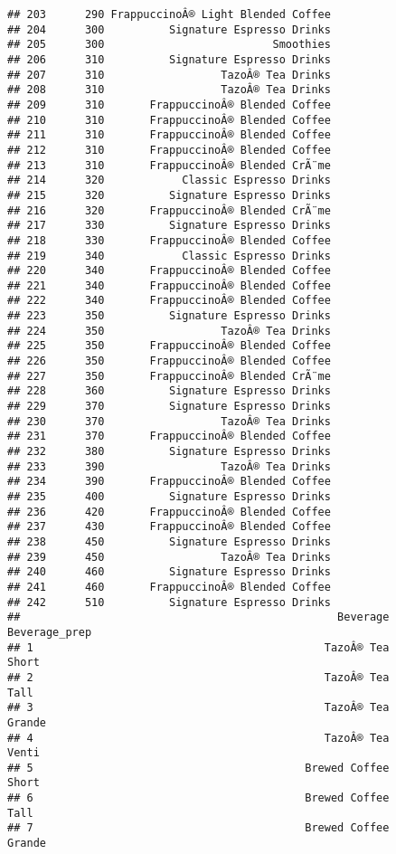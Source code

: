 \documentclass[
]{article}
\begin{document}
\begin{verbatim}
## 203      290 FrappuccinoÂ® Light Blended Coffee
## 204      300          Signature Espresso Drinks
## 205      300                          Smoothies
## 206      310          Signature Espresso Drinks
## 207      310                  TazoÂ® Tea Drinks
## 208      310                  TazoÂ® Tea Drinks
## 209      310       FrappuccinoÂ® Blended Coffee
## 210      310       FrappuccinoÂ® Blended Coffee
## 211      310       FrappuccinoÂ® Blended Coffee
## 212      310       FrappuccinoÂ® Blended Coffee
## 213      310       FrappuccinoÂ® Blended CrÃ¨me
## 214      320            Classic Espresso Drinks
## 215      320          Signature Espresso Drinks
## 216      320       FrappuccinoÂ® Blended CrÃ¨me
## 217      330          Signature Espresso Drinks
## 218      330       FrappuccinoÂ® Blended Coffee
## 219      340            Classic Espresso Drinks
## 220      340       FrappuccinoÂ® Blended Coffee
## 221      340       FrappuccinoÂ® Blended Coffee
## 222      340       FrappuccinoÂ® Blended Coffee
## 223      350          Signature Espresso Drinks
## 224      350                  TazoÂ® Tea Drinks
## 225      350       FrappuccinoÂ® Blended Coffee
## 226      350       FrappuccinoÂ® Blended Coffee
## 227      350       FrappuccinoÂ® Blended CrÃ¨me
## 228      360          Signature Espresso Drinks
## 229      370          Signature Espresso Drinks
## 230      370                  TazoÂ® Tea Drinks
## 231      370       FrappuccinoÂ® Blended Coffee
## 232      380          Signature Espresso Drinks
## 233      390                  TazoÂ® Tea Drinks
## 234      390       FrappuccinoÂ® Blended Coffee
## 235      400          Signature Espresso Drinks
## 236      420       FrappuccinoÂ® Blended Coffee
## 237      430       FrappuccinoÂ® Blended Coffee
## 238      450          Signature Espresso Drinks
## 239      450                  TazoÂ® Tea Drinks
## 240      460          Signature Espresso Drinks
## 241      460       FrappuccinoÂ® Blended Coffee
## 242      510          Signature Espresso Drinks
##                                                 Beverage      Beverage_prep
## 1                                             TazoÂ® Tea              Short
## 2                                             TazoÂ® Tea               Tall
## 3                                             TazoÂ® Tea             Grande
## 4                                             TazoÂ® Tea              Venti
## 5                                          Brewed Coffee              Short
## 6                                          Brewed Coffee               Tall
## 7                                          Brewed Coffee             Grande

\end{verbatim}
\end{document}
